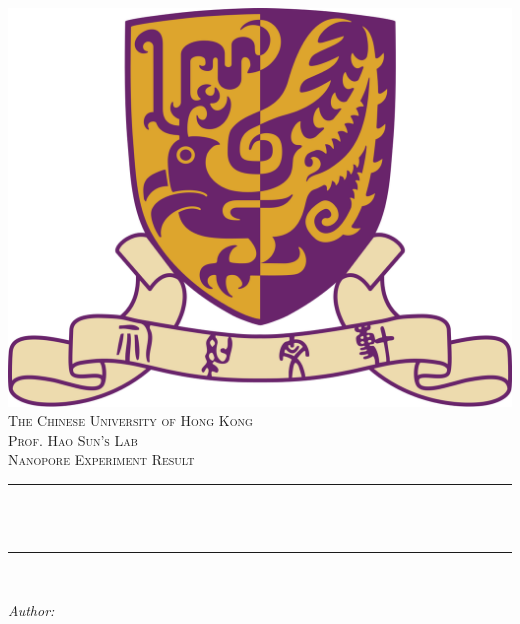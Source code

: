 \begin{titlepage}
    
	\centering
    \vspace*{0.5 cm}
    \includegraphics[scale = 0.2]{figure/cu.logo.png}\\[1.0 cm]
    \textsc{\large The Chinese University of Hong Kong}\\[2.0 cm]
	\textsc{\large Prof. Hao Sun's Lab}\\[0.5 cm]
	\textsc{\large Nanopore Experiment Result}\\[0.5 cm]
	\rule{\linewidth}{0.2 mm} \\[0.4 cm]
	{ \huge \bfseries \thetitle}\\
	\rule{\linewidth}{0.2 mm} \\[1.5 cm]
	
	\begin{minipage}{1\textwidth}
		\begin{flushleft} \large
			\emph{Author:}\\
			\theauthor
			\end{flushleft}
	\end{minipage}\\[2 cm]
	
	{\large \thedate}\\[2 cm]
 
	\vfill
	
\end{titlepage}